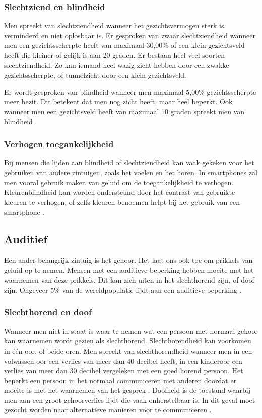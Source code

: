\subsubsection{Slechtziend en blindheid}
Men spreekt van slechtziendheid wanneer het gezichtsvermogen sterk is verminderd en niet oplosbaar is. Er gesproken van zwaar slechtziendheid wanneer men een gezichtsscherpte heeft van maximaal 30,00\% of een klein gezichtsveld heeft die kleiner of gelijk is aan 20 graden. Er bestaan heel veel soorten slechtziendheid. Zo kan iemand heel wazig zicht hebben door een zwakke gezichtsscherpte, of tunnelzicht door een klein gezichtsveld.

 Er wordt gesproken van blindheid wanneer men maximaal 5,00\% gezichtsscherpte meer bezit. Dit betekent dat men nog zicht heeft, maar heel beperkt. Ook wanneer men een gezichtsveld heeft van maximaal 10 graden spreekt men van blindheid \autocite{LiLi2019Blind}.




\subsubsection{Verhogen toegankelijkheid}
Bij mensen die lijden aan blindheid of slechtziendheid kan vaak gekeken voor het gebruiken van andere zintuigen, zoals het voelen en het horen. In smartphones zal men vooral gebruik maken van geluid om de toegankelijkheid te verhogen.
Kleurenblindheid kan worden ondersteund door het contrast van gebruikte kleuren te verhogen, of zelfs kleuren benoemen helpt bij het gebruik van een smartphone \autocite{visioKleur2019}.


\subsection{Auditief}
\label{sec:Auditief}

Een ander belangrijk zintuig is het gehoor. Het laat ons ook toe om prikkels van geluid op te nemen. Mensen met een auditieve beperking hebben moeite met het waarnemen van deze prikkels. Dit kan zich uiten in het slechthorend zijn, of doof zijn. Ongeveer 5\% van de wereldpopulatie lijdt aan een auditieve beperking \autocite{whoDAHL2019}.

\subsubsection{Slechthorend en doof}
 Wanneer men niet in staat is  waar te nemen wat een persoon met normaal gehoor kan waarnemen wordt gezien als slechthorend. Slechthorendheid kan voorkomen in één oor, of beide oren. Men spreekt van slechthorendheid wanneer men in een volwassen oor een verlies van meer dan 40 decibel heeft, in een kinderoor een verlies van meer dan 30 decibel vergeleken met een goed horend persoon. Het beperkt een persoon in het normaal communiceren met anderen doordat er moeite is met het waarnemen van het gesprek \autocite{whoDAHL2019}.
  Doofheid is de toestand waarbij men aan een groot gehoorverlies lijdt die vaak onherstelbaar is. In dit geval moet gezocht worden naar alternatieve manieren voor te communiceren \autocite{accessibility2019}.

